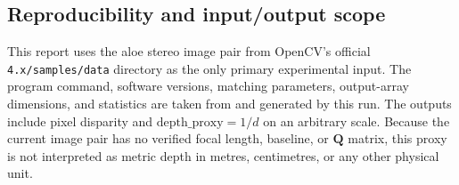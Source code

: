 \subsection{Reproducibility and input/output scope}

This report uses the aloe stereo image pair from OpenCV's official \texttt{4.x/samples/data} directory as the only primary experimental input. The program command, software versions, matching parameters, output-array dimensions, and statistics are taken from  and  generated by this run. The outputs include pixel disparity and \(\mathrm{depth\_proxy}=1/d\) on an arbitrary scale. Because the current image pair has no verified focal length, baseline, or $\mathbf{Q}$ matrix, this proxy is not interpreted as metric depth in metres, centimetres, or any other physical unit.
